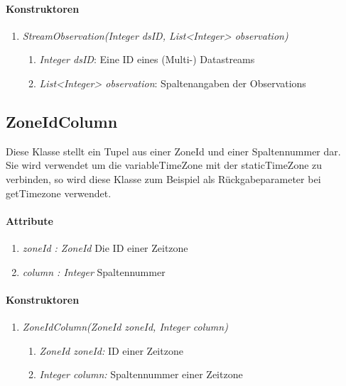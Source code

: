 \paragraph{Konstruktoren}
\begin{enumerate}[+]
	\item \textit{StreamObservation(Integer dsID, List<Integer> observation)} \\
	
	\begin{enumerate}[$\bullet$]
		\item \textit{Integer dsID}: Eine ID eines (Multi-) Datastreams
		\item \textit{List<Integer> observation}: Spaltenangaben der Observations 
	\end{enumerate}
\end{enumerate}






\subsection{ZoneIdColumn}
Diese Klasse stellt ein Tupel aus einer ZoneId und einer Spaltennummer dar.\\
Sie wird verwendet um die variableTimeZone mit der staticTimeZone zu verbinden, so wird diese Klasse zum Beispiel als Rückgabeparameter bei getTimezone verwendet.

\paragraph{Attribute}
\begin{enumerate}[-]
	\item \textit{zoneId : ZoneId} Die ID einer Zeitzone
	\item \textit{column : Integer} Spaltennummer
\end{enumerate}

\paragraph{Konstruktoren}
\begin{enumerate}[+]
	\item \textit{ZoneIdColumn(ZoneId zoneId, Integer column)} \\
	
	\begin{enumerate}[$\bullet$]
		\item \textit{ZoneId zoneId:} ID einer Zeitzone
		\item \textit{Integer column:} Spaltennummer einer Zeitzone
	\end{enumerate}
\end{enumerate}













